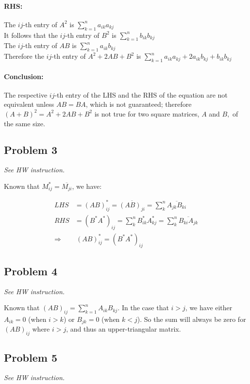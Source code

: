 \documentclass[11pt]{article}
\begin{document}
\paragraph*{RHS:}
The $ij$-th entry of $A^2$ is $\sum_{k=1}^n a_{ik}a_{kj}$\\
It follows that the $ij$-th entry of $B^2$ is $\sum_{k=1}^n b_{ik}b_{kj}$\\
The $ij$-th entry of $AB$ is $\sum_{k=1}^n a_{ik}b_{kj}$\\
Therefore the $ij$-th entry of $A^2+2AB+B^2$ is $\sum_{k=1}^n a_{ik}a_{kj} + 2a_{ik}b_{kj}+ b_{ik}b_{kj}$
\paragraph*{Conclusion:}
The respective $ij$-th entry of the LHS and the RHS of the equation are not equivalent unless $AB = BA$, which is not guaranteed; therefore $(A+B)^2=A^2+2AB+B^2$ is not true for two square matrices, $A$ and $B,$ of the same size.


\subsection*{Problem 3}
\textit{See HW instruction.}\newline

Known that $M_{ij}^* = \overline{M_{ji}}$, we have:

\begin{align*}
    LHS &= (AB)^*_{ij} = \overline{(AB)_{ji}} = \sum^{n}_{k} \overline{A_{jk} B_{ki}} \\
    RHS &= (B^* A^*)_{ij} = \sum^{n}_{k} B^{*}_{ik} A^{*}_{kj} = \sum^{n}_{k} \overline{B_{ki} A_{jk}} \\
    \Longrightarrow& \  (AB)^*_{ij} = (B^* A^*)_{ij}
\end{align*}

\subsection*{Problem 4}
\textit{See HW instruction.}\newline

Known that $(AB)_{ij} =\sum_{k=1}^{n}A_{ik}B_{kj}$. In the case that $i > j$, we have either $A_{ik} = 0$ (when $i > k$) or $B_{jk} = 0$ (when $k < j$). So the sum will always be zero for $(AB)_{ij}$ where $i > j$, and thus an upper-triangular matrix.

\subsection*{Problem 5}
\textit{See HW instruction.}\newline
\end{document}
